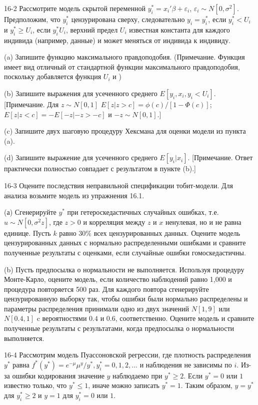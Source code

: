 16-2 Рассмотрите модель скрытой переменной $y_i^{*}=x_i'\beta+\varepsilon_i$, $\varepsilon_i{\sim}N[0,\sigma^2]$. Предположим, что $y_i^{*}$ цензурирована сверху, следовательно $y_i=y_i^{*}$, если $y_i^{*}<U_i$ и $y_i^{*}{\geq}U_i$, если $y_i^{*}U_i$, верхний предел $U_i$ известная константа для каждого индивида (например, данные) и может меняться от индивида к индивиду.

(a) Запишите функцию максимального правдоподобия. (Примечание. Функция имеет вид отличный от стандартной функции максимального правдоподобия, поскольку добавляется функция $U_i$ и  )

(b) Запишите выражения для усеченного среднего $E[y_i, x_i,y_i<U_i]$. [Примечание. Для $z{\sim}N[0,1]$ $E[z|z>c]=\phi(c)/[1-\Phi(c)]$; $E[z|z<c]=-E[-z|-z>-c]$ и $-z{\sim}N[0,1].$]

(c) Запишите двух шаговую процедуру Хексмана для оценки модели из пункта (a).

(d) Запишите выражение для усеченного среднего $E[y_i|x_i]$. [Примечание. Ответ практически полностью совпадает с результатом в пункте (b).]

16-3 Оцените последствия неправильной спецификации тобит-модели. Для анализа возьмите модель из упражнения 16.1.

(а) Сгенерируйте $y^{*}$ при гетероскедастичных случайных ошибках, т.е. $u{\sim}N[0,\sigma^2z]$, где $z>0$ и корреляция между $z$ и $x$ ненулевая, но и не равна единице. Пусть $k$ равно $30\%$ всех цензурированных данных. Оцените модель цензурированных данных с нормально распределенными ошибками и сравните полученные результаты с оценками, если случайные ошибки гомоскедастичны.

(b) Пусть предпосылка о нормальности не выполняется. Используя процедуру Монте-Карло, оцените модель, если количество наблюдений равно 1,000 и процедура повторяется 500 раз. Для каждого повтора сгенерируйте цензурированную выборку так, чтобы ошибки были нормально распределены и параметры распределения принимали одно из двух значений $N[1,9]$ или $N[0.4,1]$ c вероятностями $0.4$ и $0.6$, соответственно. Оцените модель  и сравните полученные результаты с результатами, когда предпосылка о нормальности выполняется.

16-4 Рассмотрим модель Пуассоновской регрессии, где плотность распределения $y^{*}$ равна $f^{*}(y^{*})=e^{-\mu}\mu^{y}/y^{*}, y_i^{*}=0,1,2,...$ и наблюдения не зависимы по $i$. Из-за ошибки кодирования значение $y$ наблюдаемо при $y^{*}{\geq}2$. Если $y^{*}=0$ или $1$ известно только, что $y^{*}{\leq}1$, иначе можно записать $y^{*}=1$. Таким образом, $y=y^{*}$ для $y_i^{*}{\geq}2$ и $y=1$ для $y_i^{*}=0$ или $1$.

